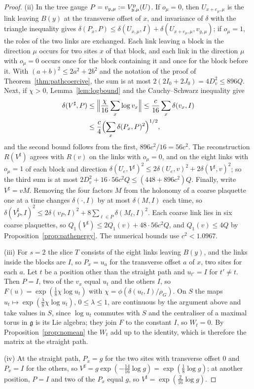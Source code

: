 \documentclass[11pt]{amsart}
\theoremstyle{definition}
\theoremstyle{remark}
\numberwithin{equation}{section}
\begin{document}
\begin{proof}
(ii) In the tree gauge $P=v_{y,\mu}:=V^{\rm p}_{y,\mu}(U)$. If $o_\mu=0$,
then $U_{x+e_\mu,\mu}$ is the link leaving $B(y)$ at the transverse offset of
$x$, and invariance of $\delta$ with the triangle inequality gives
$\delta(P_x,P)\le\delta(U_{x,\mu},I)+\delta(U_{x+e_\mu,\mu},v_{y,\mu})$; if
$o_\mu=1$, the roles of the two links are exchanged. Each link leaving a
block in the direction $\mu$ occurs for two sites $x$ of that block, and
each link in the direction $\mu$ with $o_\mu=0$ occurs once for the block
containing it and once for the block before it. With $(a+b)^2\le2a^2+2b^2$
and the notation of the proof of Theorem~\ref{thm:pathcoercive}, the sum is
at most $2(2I_0+2J_0)=4D_v^2\le896Q$. Next, if $\chi>0$,
Lemma~\ref{lem:logbound} and the Cauchy--Schwarz inequality give
\begin{align*}
\delta(V^\sharp,P)&\le\Bigl\lVert\frac\chi{16}\sum_x\log v_x\Bigr\rVert\le
\frac c{16}\sum_x\delta(v_x,I)\\
&\le\frac c4\Bigl(\sum_x\delta(P_x,P)^2\Bigr)^{1/2},
\end{align*}
and the second bound follows from the first, $896c^2/16=56c^2$. The
reconstruction $R(V^\sharp)$ agrees with $R(v)$ on the links with $o_\mu=0$,
and on the eight links with $o_\mu=1$ of each block and direction
$\delta(U_e,V^\sharp)^2\le2\delta(U_e,v)^2+2\delta(V^\sharp,v)^2$; so the
third sum is at most $2D_v^2+16\cdot56c^2Q\le(448+896c^2)Q$. Finally, write
$V^\sharp=vM$. Removing the four factors $M$ from the holonomy of a coarse
plaquette one at a time changes $\delta(\cdot,I)$ by at most $\delta(M,I)$
each time, so $\delta(V^\sharp_P,I)^2\le2\delta(v_P,I)^2+8\sum_{\ell\in P}
\delta(M_\ell,I)^2$. Each coarse link lies in six coarse plaquettes, so
$Q_1(V^\sharp)\le2Q_1(v)+48\cdot56c^2Q$, and $Q_1(v)\le4Q$ by
Proposition~\ref{prop:pathenergy}. The numerical bounds use $c^2<1.0967$.

(iii) For $s=2$ the slice $T$ consists of the eight links leaving $B(y)$,
and the links inside the blocks are $I$, so $P_x=u_{a}$ for the transverse
offset $a$ of $x$, two sites for each $a$. Let $t$ be a position other than
the straight path and $u_{t'}=I$ for $t'\ne t$. Then $P=I$, two of the
$v_x$ equal $u_t$ and the others $I$, so $F(u)=\exp(\frac18\chi\log u_t)$
with $\chi=\phi(\delta(u_t,I)/\rho_G)$. On $S$ the maps
$u_t\mapsto\exp(\frac\lambda8\chi\log u_t)$, $0\le\lambda\le1$, are
continuous by the argument above and take values in $S$, since $\log u_t$
commutes with $S$ and the centraliser of a maximal torus in $\mathfrak g$ is
its Lie algebra; they join $F$ to the constant $I$, so
$W_t=0$. By Proposition~\ref{prop:nomean} the $W_t$ add up to the identity,
which is therefore the matrix at the straight path.

(iv) At the straight path, $P_x=g$ for the two sites with transverse offset
$0$ and $P_x=I$ for the others, so $V^\sharp=g\exp(-\frac{14}{16}\log g)=
\exp(\frac18\log g)$; at another position, $P=I$ and two of the $P_x$ equal
$g$, so $V^\sharp=\exp(\frac2{16}\log g)$.
\end{proof}
\end{document}
